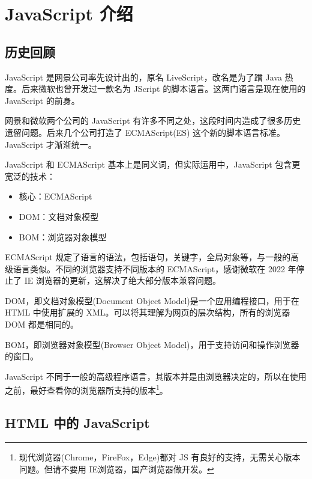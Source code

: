 \section{JavaScript 介绍}
\subsection{历史回顾}

JavaScript 是网景公司率先设计出的，原名 LiveScript，改名是为了蹭 Java 热度。后来微软也曾开发过一款名为 JScript 的脚本语言。这两门语言是现在使用的 JavaScript 的前身。

网景和微软两个公司的 JavaScript 有许多不同之处，这段时间内造成了很多历史遗留问题。后来几个公司打造了 ECMAScript(ES) 这个新的脚本语言标准。JavaScript 才渐渐统一。

JavaScript 和 ECMAScript 基本上是同义词，但实际运用中，JavaScript 包含更宽泛的技术：
\begin{itemize}
    \item 核心：ECMAScript
    \item DOM：文档对象模型
    \item BOM：浏览器对象模型
\end{itemize}

ECMAScript 规定了语言的语法，包括语句，关键字，全局对象等，与一般的高级语言类似。不同的浏览器支持不同版本的 ECMAScript，感谢微软在 2022 年停止了 IE 浏览器的更新，这解决了绝大部分版本兼容问题。

DOM，即文档对象模型(Document Object Model)是一个应用编程接口，用于在 HTML 中使用扩展的 XML。可以将其理解为网页的层次结构，所有的浏览器 DOM 都是相同的。

BOM，即浏览器对象模型(Browser Object Model)，用于支持访问和操作浏览器的窗口。

JavaScript 不同于一般的高级程序语言，其版本并是由浏览器决定的，所以在使用之前，最好查看你的浏览器所支持的版本\footnote{现代浏览器(Chrome，FireFox，Edge)都对 JS 有良好的支持，无需关心版本问题。但请不要用 IE浏览器，国产浏览器做开发。}。

\subsection{HTML 中的 JavaScript}
 
